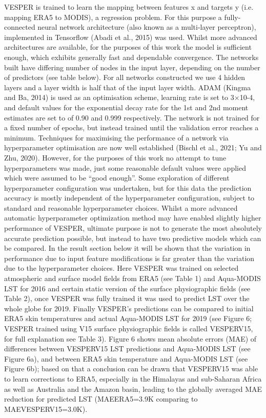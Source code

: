 \documentclass[hess, manuscript]{copernicus}
\begin{document}
VESPER is trained to learn the mapping between features x and targets y (i.e. mapping ERA5 to MODIS), a regression problem. For this purpose a fully-connected neural network architecture (also known as a multi-layer perceptron), implemented in Tensorflow (Abadi et al., 2015) was used. Whilst more advanced architectures are available, for the purposes of this work the model is sufficient enough, which exhibits generally fast and dependable convergence. The networks built have differing number of nodes in the input layer, depending on the number of predictors (see table below). For all networks constructed we use 4 hidden layers and a layer width is half that of the input layer width. ADAM (Kingma and Ba, 2014) is used as an optimisation scheme, learning rate is set to 3×10-4, and default values for the exponential decay rate for the 1st and 2nd moment estimates are set to of 0.90 and 0.999 respectively. The network is not trained for a fixed number of epochs, but instead trained until the validation error reaches a minimum. Techniques for maximising the performance of a network via hyperparameter optimisation are now well established (Bischl et al., 2021; Yu and Zhu, 2020). However, for the purposes of this work no attempt to tune hyperparameters was made, just some reasonable default values were applied which were assumed to be “good enough”. Some exploration of different hyperparameter configuration was undertaken, but for this data the prediction accuracy is mostly independent of the hyperparameter configuration, subject to standard and reasonable hyperparameter choices. Whilst a more advanced automatic hyperparameter optimization method may have enabled slightly higher performance of VESPER, ultimate purpose is not to generate the most absolutely accurate prediction possible, but instead to have two predictive models which can be compared. In the result section below it will be shown that the variation in performance due to input feature modifications is far greater than the variation due to the hyperparameter choices. Here VESPER was trained on selected atmospheric and surface model fields from ERA5 (see Table 1) and Aqua-MODIS LST for 2016 and certain static version of the surface physiographic fields (see Table 2), once VESPER was fully trained it was used to predict LST over the whole globe for 2019. Finally VESPER’s predictions can be compared to initial ERA5 skin temperatures and actual Aqua-MODIS LST for 2019 (see Figure 6; VESPER trained using V15 surface physiographic fields is called VESPERV15, for full explanation see Table 3). Figure 6 shows mean absolute errors (MAE) of differences between VESPERV15 LST predictions and Aqua-MODIS LST (see Figure 6a), and between ERA5 skin temperature and Aqua-MODIS LST (see Figure 6b); based on that a conclusion can be drawn that VESPERV15 was able to learn corrections to ERA5, especially in the Himalayas and sub-Saharan Africa as well as Australia and the Amazon basin, leading to the globally averaged MAE reduction for predicted LST (MAEERA5=3.9K comparing to MAEVESPERV15=3.0K). 
\end{document}
